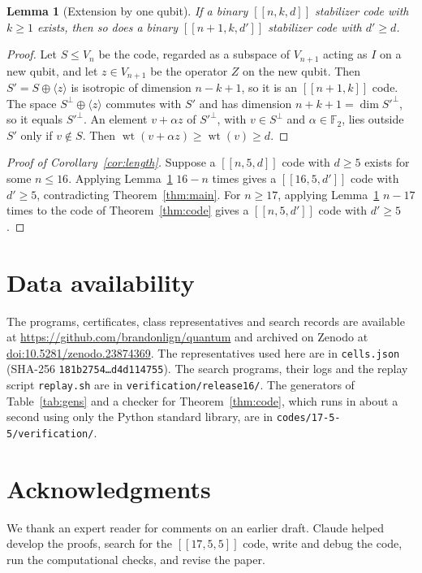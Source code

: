 \documentclass[11pt]{article}
\newtheorem{lemma}[theorem]{Lemma}
\theoremstyle{definition}
\theoremstyle{remark}
\newcommand{\F}{\mathbb F_2}
\newcommand{\qc}[1]{[\![#1]\!]}
\newcommand{\wt}{\operatorname{wt}}
\newcommand{\pathcode}[1]{{\small\nolinkurl{#1}}}
\begin{document}
\begin{lemma}[Extension by one qubit]\label{lem:pad}
If a binary \(\qc{n,k,d}\) stabilizer code with \(k\geq1\) exists, then
so does a binary \(\qc{n+1,k,d'}\) stabilizer code with \(d'\geq d\).
\end{lemma}
\begin{proof}
Let \(S\leq V_n\) be the code, regarded as a subspace of \(V_{n+1}\)
acting as \(I\) on a new qubit, and let \(z\in V_{n+1}\) be the
operator \(Z\) on the new qubit. Then \(S'=S\oplus\langle z\rangle\) is
isotropic of dimension \(n-k+1\), so it is an \(\qc{n+1,k}\) code. The
space \(S^\perp\oplus\langle z\rangle\) commutes with \(S'\) and has
dimension \(n+k+1=\dim S'^\perp\), so it equals \(S'^\perp\). An element
\(v+\alpha z\) of \(S'^\perp\), with \(v\in S^\perp\) and
\(\alpha\in\F\), lies outside \(S'\) only if \(v\notin S\). Then
\(\wt(v+\alpha z)\geq\wt(v)\geq d\).
\end{proof}

\begin{proof}[Proof of Corollary~\ref{cor:length}]
Suppose a \(\qc{n,5,d}\) code with \(d\geq5\) exists for some
\(n\leq16\). Applying Lemma~\ref{lem:pad} \(16-n\) times gives a
\(\qc{16,5,d'}\) code with \(d'\geq5\), contradicting
Theorem~\ref{thm:main}. For \(n\geq17\), applying Lemma~\ref{lem:pad}
\(n-17\) times to the code of Theorem~\ref{thm:code} gives a
\(\qc{n,5,d'}\) code with \(d'\geq5\).
\end{proof}

\section*{Data availability}
The programs, certificates, class representatives and search records are
available at \url{https://github.com/brandonlign/quantum} and archived on
Zenodo at
\href{https://doi.org/10.5281/zenodo.23874369}{doi:10.5281/zenodo.23874369}.
The representatives used here are in \pathcode{cells.json} (SHA-256
\texttt{181b2754\ldots d4d114755}).
The search programs, their logs and the replay script
\pathcode{replay.sh} are in \pathcode{verification/release16/}.
The generators of Table~\ref{tab:gens} and a checker for
Theorem~\ref{thm:code}, which runs in about a second using only the
Python standard library, are in \pathcode{codes/17-5-5/verification/}.

\section*{Acknowledgments}
We thank an expert reader for comments on an earlier draft. Claude
helped develop the proofs, search for the \(\qc{17,5,5}\) code, write
and debug the code, run the computational checks, and revise the
paper.
\end{document}
